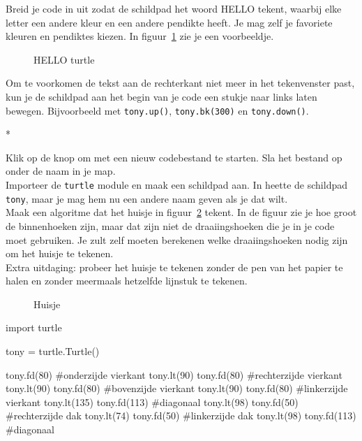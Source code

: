 \documentclass[../main]{subfiles}
\begin{document}
\begin{opgave}[icons={laptop}]
Breid je code in  uit zodat de schildpad het woord \textsf{HELLO} tekent, waarbij elke letter een andere kleur en een andere pendikte heeft. Je mag zelf je favoriete kleuren en pendiktes kiezen. In figuur~\ref{fig:hello_turtle_04} zie je een voorbeeldje.

\begin{figure}[ht]
    \centering
    \caption{HELLO turtle}%
    \label{fig:hello_turtle_04}
\end{figure}

\begin{hints}
\item Om te voorkomen de tekst aan de rechterkant niet meer in het tekenvenster past, kun je de schildpad aan het begin van je code een stukje naar links laten bewegen. Bijvoorbeeld met \texttt{tony.up()}, \texttt{tony.bk(300)} en \texttt{tony.down()}.
\end{hints}
\end{opgave}
\begin{antwoord}
*
\end{antwoord}
\begin{opgave}[icons={laptop}]
Klik op de  knop om met een nieuw codebestand te starten. Sla het bestand op onder de naam  in je  map.\\
Importeer de \texttt{turtle} module en maak een schildpad aan. In  heette de schildpad \texttt{tony}, maar je mag hem nu een andere naam geven als je dat wilt.\\
Maak een algoritme dat het huisje in figuur~\ref{fig:turtle-house} tekent. In de figuur zie je hoe groot de binnenhoeken zijn, maar dat zijn niet de draaiingshoeken die je in je code moet gebruiken. Je zult zelf moeten berekenen welke draaiingshoeken nodig zijn om het huisje te tekenen.\\
Extra uitdaging: probeer het huisje te tekenen zonder de pen van het papier te halen en zonder meermaals hetzelfde lijnstuk te tekenen.
\begin{figure}[ht]
    \centering
    \caption{Huisje}%
    \label{fig:turtle-house}
\end{figure}
\end{opgave}
\begin{antwoord}
\begin{python-breakable}[style=mu-noframe]
import turtle

tony = turtle.Turtle()

tony.fd(80)     #onderzijde vierkant
tony.lt(90)
tony.fd(80)     #rechterzijde vierkant
tony.lt(90)
tony.fd(80)     #bovenzijde vierkant
tony.lt(90)
tony.fd(80)     #linkerzijde vierkant
tony.lt(135)
tony.fd(113)    #diagonaal
tony.lt(98)
tony.fd(50)     #rechterzijde dak
tony.lt(74)
tony.fd(50)     #linkerzijde dak
tony.lt(98)
tony.fd(113)    #diagonaal
\end{python-breakable}
\end{antwoord}
\end{document}
